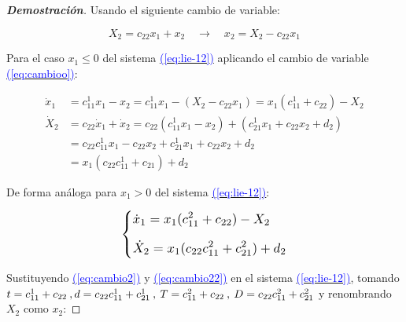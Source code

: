\documentclass[12pt,a4paper]{report} %
\newcommand{\eref}[1]{\hyperref[#1]{\textcolor{blue}{(\ref*{#1})}}}
\newcommand{\eref}[1]{\hyperref[#1]{\textcolor{blue}{\textit{(\ref*{#1})}}}}
\begin{document}
	\begin{proof}[\textbf{Demostración}]
	Usando el siguiente cambio de variable:
	
	\begin{equation}
		\label{eq:cambioo}
		X_2=c_{22}x_1+x_2\quad \rightarrow \quad x_2=X_2-c_{22}x_1
	\end{equation}\smallskip
	
	\noindent Para el caso $x_1\leq 0$ del sistema \eref{eq:lie-12} aplicando el cambio de variable \eref{eq:cambioo}:
	
		\begin{equation}
		\label{eq:cambio2}
		\begin{aligned}
			\dot{x}_1&=c_{11}^1x_1-x_2=c_{11}^1x_1-(X_2-c_{22}x_1)=x_1(c_{11}^1+c_{22})-X_2 \\[2mm]
			\dot{X}_2&=c_{22}\dot{x}_1+\dot{x}_2=c_{22}(c_{11}^1x_1-x_2)+(c_{21}^1x_1+c_{22}x_2+d_2) \\[2mm]
			&=c_{22}c_{11}^1x_1-c_{22}x_2+c_{21}^1x_1+c_{22}x_2+d_2 \\[2mm]
			&=x_1(c_{22}c_{11}^1+c_{21})+d_2
		\end{aligned}
		\end{equation}\smallskip
	
	\noindent De forma análoga para $x_1>0$ del sistema \eref{eq:lie-12}:
	
	\begin{equation}
		\label{eq:cambio22}
		\scalebox{1.2}{$\displaystyle
			\left\{
			\begin{aligned}
				&\dot{x}_1=x_1(c_{11}^2+c_{22})-X_2 \\[2mm]
				&\dot{X}_2=x_1(c_{22}c_{11}^2+c_{21}^2)+d_2
			\end{aligned}
			\right.
			$}
	\end{equation}\smallskip
	
 	\noindent Sustituyendo \eref{eq:cambio2} y \eref{eq:cambio22} en el sistema \eref{eq:lie-12}, tomando $t=c_{11}^1+c_{22} \: , \:\\ d=c_{22}c_{11}^1+c_{21}^1 \: , \:  T=c_{11}^2+c_{22} \: , \: D=c_{22}c_{11}^2+c_{21}^2$ y renombrando $X_2$ como $x_2$:
	

\end{proof}
\end{document}

